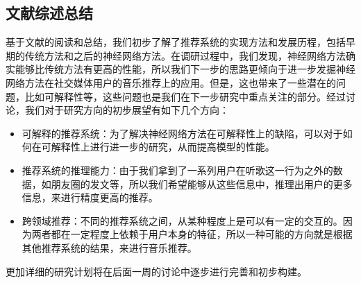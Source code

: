 \subsection{文献综述总结}
基于文献的阅读和总结，我们初步了解了推荐系统的实现方法和发展历程，包括早期的传统方法和之后的神经网络方法。在调研过程中，我们发现，神经网络方法确实能够比传统方法有更高的性能，所以我们下一步的思路更倾向于进一步发掘神经网络方法在社交媒体用户的音乐推荐上的应用。但是，这也带来了一些潜在的问题，比如可解释性等，这些问题也是我们在下一步研究中重点关注的部分。经过讨论，我们对于研究方向的初步展望有如下几个方向：
\begin{itemize}
    \item 可解释的推荐系统：为了解决神经网络方法在可解释性上的缺陷，可以对于如何在可解释性上进行进一步的研究，从而提高模型的性能。
    \item 推荐系统的推理能力：由于我们拿到了一系列用户在听歌这一行为之外的数据，如朋友圈的发文等，所以我们希望能够从这些信息中，推理出用户的更多信息，来进行精度更高的推荐。
    \item 跨领域推荐：不同的推荐系统之间，从某种程度上是可以有一定的交互的。因为两者都在一定程度上依赖于用户本身的特征，所以一种可能的方向就是根据其他推荐系统的结果，来进行音乐推荐。
\end{itemize}
更加详细的研究计划将在后面一周的讨论中逐步进行完善和初步构建。